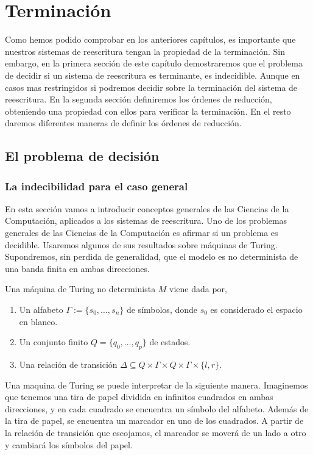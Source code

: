 \chapter{Terminación}

Como hemos podido comprobar en los anteriores capítulos, es importante
que nuestros sistemas de reescritura tengan la propiedad de la
terminación. Sin embargo, en la primera sección de este capítulo
demostraremos que el problema de decidir si un sistema de reescritura
es terminante, es indecidible. Aunque en casos mas restringidos si
podremos decidir sobre la terminación del sistema de reescritura. En
la segunda sección definiremos los órdenes de reducción, obteniendo
una propiedad con ellos para verificar la terminación. En el resto
daremos diferentes maneras de definir los órdenes de reducción.

\section{El problema de decisión}

\subsection{La indecibilidad para el caso general}

En esta sección vamos a introducir conceptos generales de las Ciencias
de la Computación, aplicados a los sistemas de reescritura. Uno de los
problemas generales de las Ciencias de la Computación es afirmar si un
problema es decidible. Usaremos algunos de sus resultados sobre
máquinas de Turing. Supondremos, sin perdida de generalidad, que el
modelo es no determinista de una banda finita en ambas direcciones.

\begin{defi} 
  Una máquina de Turing no determinista $M$ viene dada por,
  \begin{enumerate}
  \item Un alfabeto $\Gamma := \{s_0, \dots, s_n \}$ de símbolos,
    donde $s_0$ es considerado el espacio en blanco.
  \item Un conjunto finito $Q = \{q_0, \dots, q_p \}$ de estados.
  \item Una relación de transición
    $\Delta \subseteq Q \times \Gamma \times Q \times \Gamma \times \{
    l,r \} $.
  \end{enumerate}
\end{defi}

Una maquina de Turing se puede interpretar de la siguiente
manera. Imaginemos que tenemos una tira de papel dividida en infinitos
cuadrados en ambas direcciones, y en cada cuadrado se encuentra un símbolo del
alfabeto. Además de la tira de papel, se encuentra un marcador en uno
de los cuadrados. A partir de la relación de transición que escojamos,
el marcador se moverá de un lado a otro y cambiará los símbolos del
papel. 

